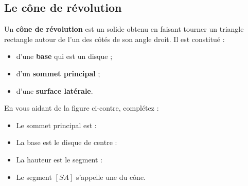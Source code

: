 \documentclass[a4paper]{book}
\begin{document}
\subsection{Le cône de révolution}
    \begin{definition}
        Un \textbf{cône de révolution} est un solide obtenu en faisant tourner un triangle rectangle autour de l'un des côtés de son angle droit. Il est constitué :
        \begin{itemize}
            \item d'une \textbf{base} qui est un disque ;
            \item d'un \textbf{sommet principal} ;
            \item d'une \textbf{surface latérale}.
        \end{itemize}
    \end{definition}
    
    \noindent
    \begin{minipage}{0.55\textwidth}
    \begin{exemple}
        En vous aidant de la figure ci-contre, complétez :
        \begin{itemize}
            \item Le sommet principal est : \points[6]
            \item La base est le disque de centre : \points[5]
            \item La hauteur est le segment : \points[6]
            \item Le segment $[SA]$ s'appelle une \points[8] du cône.
        \end{itemize}
    \end{exemple}
    \end{minipage}
    \hfill
    \begin{minipage}{0.4\textwidth}
    \centering
    \end{minipage}
    
\end{document}
